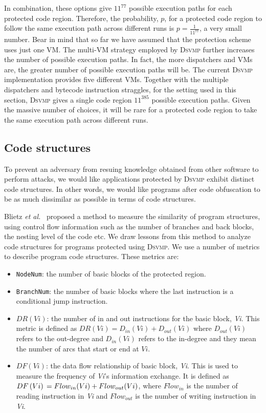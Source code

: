 \documentclass[conference]{IEEEtran}
\newcommand{\DSVMP}{\textsc{Dsvmp}\xspace}
\begin{document}
In combination, these options give $11^{77}$ possible execution paths for each protected code region.
Therefore, the probability, $p$, for a protected code region to follow the same execution path across
different runs is $p= \frac{1}{{{{11}^{77}}}}$, a very small number.
Bear in mind that so far we have assumed that the protection scheme uses just one VM.
The multi-VM strategy employed by \DSVMP further increases the number of possible execution paths.
In fact, the more dispatchers and VMs are, the greater number of possible execution paths will be.
The current \DSVMP implementation provides five different VMs. Together with the multiple dispatchers
and bytecode instruction straggles, for the setting used in this section, \DSVMP gives a single code region
$11^{385}$ possible execution paths. Given the massive number of choices, it will be rare for
a protected code region to take the same execution path across different runs.



\subsection{Code structures}
To prevent an adversary from resuing knowledge obtained from other software to perform attacks,
we would like applications protected by \DSVMP exhibit distinct code structures. In other words,
we would like programs after code obfuscation to be as much dissimilar as possible in terms of code structures.

Blietz \emph{et al.}~\cite{18blietz2006software} proposed a method to measure the similarity of program structures, using control flow
information such as the number of branches and back blocks, the nesting level of the code etc. We draw lessons from this method to analyze code structures for programs protected using \DSVMP. We use a number of metrics to describe program code structures. These metrics are:

\begin{itemize}
\item \texttt{NodeNum}: the number of basic blocks of the protected region.
\item \texttt{BranchNum}: the number of basic blocks where the last instruction is a conditional jump instruction.
\item $DR(Vi)$: the number of in and out instructions for the basic block, \emph{Vi}. This metric is defined as $DR(Vi) = {D_{in}}(Vi) + {D_{out}}(Vi)$ where ${D_{out}}\left( {Vi} \right)$ refers to the out-degree and ${D_{in}}\left( {Vi} \right)$ refers to the in-degree and they mean the number of arcs that start or end at $Vi$.
\item $DF(Vi)$: the data flow relationship of basic block, \emph{Vi}. This is used to measure the frequency of \emph{Vi}'s information exchange. It is defined as $DF\left( {Vi} \right){\rm{ }} = {\rm{ }}Flo{w_{in}}(Vi) + Flo{w_{out}}(Vi)$, where $Flo{w_{in}}$ is the number of reading instruction in \emph{Vi} and $Flo{w_{out}}$ is the number of writing instruction in \emph{Vi}.
\end{itemize}
\end{document}

